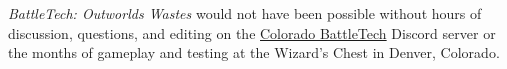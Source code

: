 \emph{BattleTech: Outworlds Wastes} would not have been possible without hours of discussion, questions, and editing on the \href{https://coloradobt.org}{Colorado BattleTech} Discord server or the months of gameplay and testing at the Wizard's Chest in Denver, Colorado.
